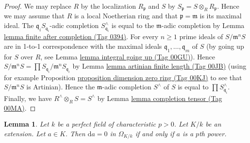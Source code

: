 \documentclass{amsart}
\theoremstyle{plain}
\newtheorem{lemma}[subsection]{Lemma}
\theoremstyle{definition}
\theoremstyle{remark}
\numberwithin{equation}{subsection}
\begin{document}
\begin{proof}
We may replace $R$ by the localization $R_\mathfrak p$ and
$S$ by $S_\mathfrak p = S \otimes_R R_\mathfrak p$.
Hence we may assume that $R$ is a local Noetherian ring and
that $\mathfrak p = \mathfrak m$ is its maximal ideal.
The $\mathfrak q_iS_{\mathfrak q_i}$-adic completion
$S_{\mathfrak q_i}^\wedge$ is equal to the $\mathfrak m$-adic
completion by Lemma \href{https://stacks.math.columbia.edu/tag/0394}{lemma finite after completion (Tag 0394)}.
For every $n \geq 1$ prime ideals of $S/\mathfrak m^nS$ are in 1-to-1
correspondence with the maximal ideals
$\mathfrak q_1, \ldots, \mathfrak q_m$ of $S$
(by going up for $S$ over $R$, see
Lemma \href{https://stacks.math.columbia.edu/tag/00GU}{lemma integral going up (Tag 00GU)}).
Hence
$S/\mathfrak m^nS = \prod S_{\mathfrak q_i}/\mathfrak m^nS_{\mathfrak q_i}$
by Lemma \href{https://stacks.math.columbia.edu/tag/00JB}{lemma artinian finite length (Tag 00JB)}
(using for example
Proposition \href{https://stacks.math.columbia.edu/tag/00KJ}{proposition dimension zero ring (Tag 00KJ)}
to see that $S/\mathfrak m^nS$ is Artinian).
Hence the $\mathfrak m$-adic completion $S^\wedge$ of $S$ is equal to
$\prod S_{\mathfrak q_i}^\wedge$. Finally, we have
$R^\wedge \otimes_R S = S^\wedge$ by Lemma \href{https://stacks.math.columbia.edu/tag/00MA}{lemma completion tensor (Tag 00MA)}.
\end{proof}


\begin{lemma}
\label{algebra-lemma-derivative-zero-pth-power}
Let $k$ be a perfect field of characteristic $p > 0$.
Let $K/k$ be an extension.
Let $a \in K$. Then $\text{d}a = 0$ in $\Omega_{K/k}$
if and only if $a$ is a $p$th power.
\end{lemma}
\end{document}
